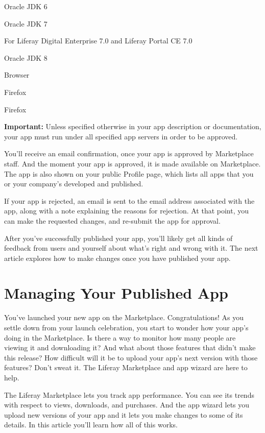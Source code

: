 Oracle JDK 6

Oracle JDK 7

{For Liferay Digital Enterprise 7.0 and Liferay Portal CE 7.0}

Oracle JDK 8

Browser

Firefox

Firefox

\textbf{Important:} Unless specified otherwise in your app description
or documentation, your app must run under all specified app servers in
order to be approved.

You'll receive an email confirmation, once your app is approved by
Marketplace staff. And the moment your app is approved, it is made
available on Marketplace. The app is also shown on your public Profile
page, which lists all apps that you or your company's developed and
published.

If your app is rejected, an email is sent to the email address
associated with the app, along with a note explaining the reasons for
rejection. At that point, you can make the requested changes, and
re-submit the app for approval.

After you've successfully published your app, you'll likely get all
kinds of feedback from users and yourself about what's right and wrong
with it. The next article explores how to make changes once you have
published your app.

\section{Managing Your Published App}\label{managing-your-published-app}

You've launched your new app on the Marketplace. Congratulations! As you
settle down from your launch celebration, you start to wonder how your
app's doing in the Marketplace. Is there a way to monitor how many
people are viewing it and downloading it? And what about those features
that didn't make this release? How difficult will it be to upload your
app's next version with those features? Don't sweat it. The Liferay
Marketplace and app wizard are here to help.

The Liferay Marketplace lets you track app performance. You can see its
trends with respect to views, downloads, and purchases. And the app
wizard lets you upload new versions of your app and it lets you make
changes to some of its details. In this article you'll learn how all of
this works.

